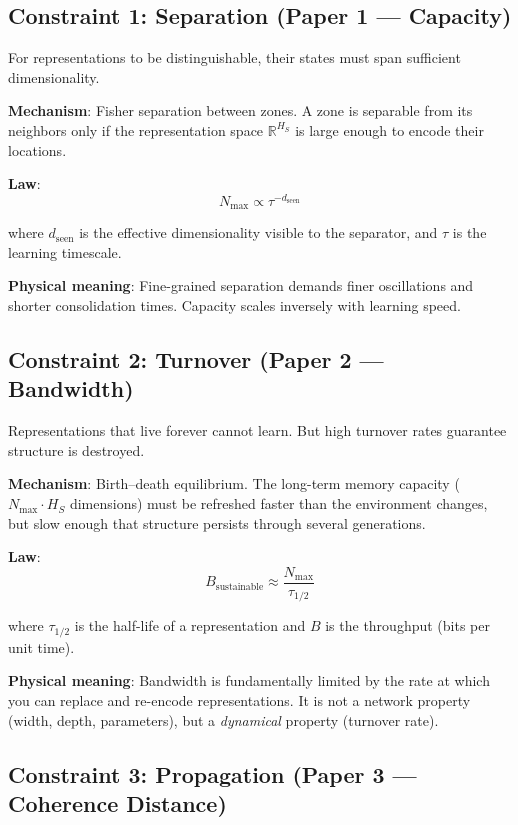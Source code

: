 \documentclass[11pt]{article}
\begin{document}
\bigskip

\subsection{Constraint 1: Separation (Paper 1 — Capacity)}

For representations to be distinguishable, their states must span sufficient dimensionality.

\textbf{Mechanism}: Fisher separation between zones. A zone is separable from its neighbors only if the representation space $\mathbb{R}^{H_S}$ is large enough to encode their locations.

\textbf{Law}:
\begin{equation}
N_{\max} \propto \tau^{-d_{\text{seen}}}
\end{equation}

where $d_{\text{seen}}$ is the effective dimensionality visible to the separator, and $\tau$ is the learning timescale.

\textbf{Physical meaning}: Fine-grained separation demands finer oscillations and shorter consolidation times. Capacity scales inversely with learning speed.

\subsection{Constraint 2: Turnover (Paper 2 — Bandwidth)}

Representations that live forever cannot learn. But high turnover rates guarantee structure is destroyed.

\textbf{Mechanism}: Birth--death equilibrium. The long-term memory capacity ($N_{\max} \cdot H_S$ dimensions) must be refreshed faster than the environment changes, but slow enough that structure persists through several generations.

\textbf{Law}:
\begin{equation}
B_{\text{sustainable}} \approx \frac{N_{\max}}{\tau_{1/2}}
\end{equation}

where $\tau_{1/2}$ is the half-life of a representation and $B$ is the throughput (bits per unit time).

\textbf{Physical meaning}: Bandwidth is fundamentally limited by the rate at which you can replace and re-encode representations. It is not a network property (width, depth, parameters), but a \emph{dynamical} property (turnover rate).

\subsection{Constraint 3: Propagation (Paper 3 — Coherence Distance)}
\end{document}
